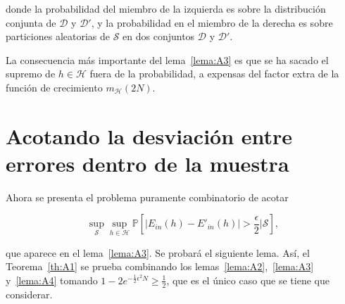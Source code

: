 donde la probabilidad del miembro de la izquierda es sobre la distribución
conjunta de $\mathcal{D}$ y $\mathcal{D}'$, y la probabilidad en el miembro de
la derecha es sobre particiones aleatorias de $\mathcal{S}$ en dos conjuntos
$\mathcal{D}$ y $\mathcal{D}'$.

La consecuencia más importante del lema~\ref{lema:A3} es que se ha sacado el
supremo de $h \in \mathcal{H}$ fuera de la probabilidad, a expensas del factor
extra de la función de crecimiento $m_{\mathcal{H}}(2N)$.

\section{Acotando la desviación entre errores dentro de la muestra}

Ahora se presenta el problema puramente combinatorio de acotar

\begin{displaymath}
    \sup_{\mathcal{S}} \sup_{h \in \mathcal{H}} \mathbb{P} \left[| E_{in}(h) - E'_{in}(h) | > \frac{\epsilon}{2} \Big\vert \mathcal{S} \right],
\end{displaymath}

que aparece en el lema~\ref{lema:A3}. Se probará el siguiente lema. Así, el
Teorema~\ref{th:A1} se prueba combinando los lemas~\ref{lema:A2},~\ref{lema:A3}
y~\ref{lema:A4} tomando $1 - 2e^{- \frac{1}{2} \epsilon^2 N} \geq \frac{1}{2}$,
que es el único caso que se tiene que considerar.


